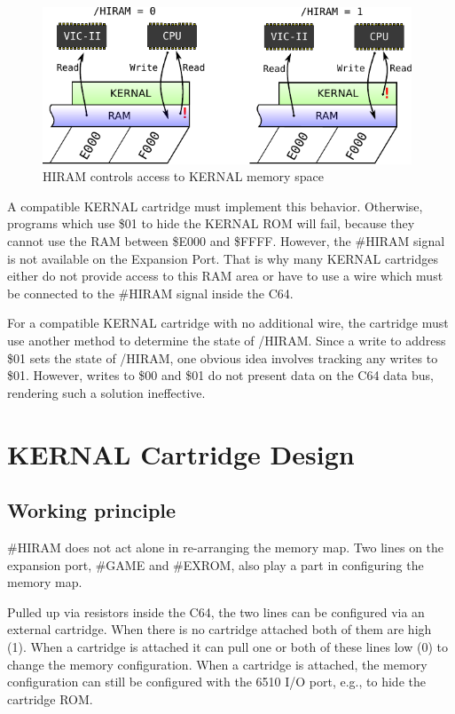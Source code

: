 \documentclass[a4paper,oneside]{memoir}
\begin{document}
\begin{figure}
    \centering
    \includegraphics[width=11cm]{src/memory-map-hiram}
    \caption{HIRAM controls access to KERNAL memory space}
    \label{fig:memory-map-hiram}
\end{figure}

A compatible KERNAL cartridge must implement this behavior.
Otherwise, programs which use \$01 to hide the KERNAL ROM will fail,
because they cannot use the RAM between \$E000 and \$FFFF. However,
the \#HIRAM signal is not available on the Expansion Port. That is why
many KERNAL cartridges either do not provide access to this RAM area
or have to use a wire which must be connected to the \#HIRAM signal
inside the C64.

For a compatible KERNAL cartridge with no additional wire, the
cartridge must use another method to determine the state of /HIRAM.
Since a write to address \$01 sets the state of /HIRAM, one obvious
idea involves tracking any writes to \$01. However, writes to \$00
and \$01 do not present data on the C64 data bus, rendering such a
solution ineffective.

\chapter{KERNAL Cartridge Design}

\section{Working principle}

\#HIRAM does not act alone in re-arranging the memory map. Two lines
on the expansion port, \#GAME and \#EXROM, also play a part in
configuring the memory map.

Pulled up via resistors inside the C64, the two lines can be
configured via an external cartridge. When there is no cartridge
attached both of them are high (1). When a cartridge is attached it
can pull one or both of these lines low (0) to change the memory
configuration. When a cartridge is attached, the memory
configuration can still be configured with the 6510 I/O port, e.g.,
to hide the cartridge ROM.
\end{document}
